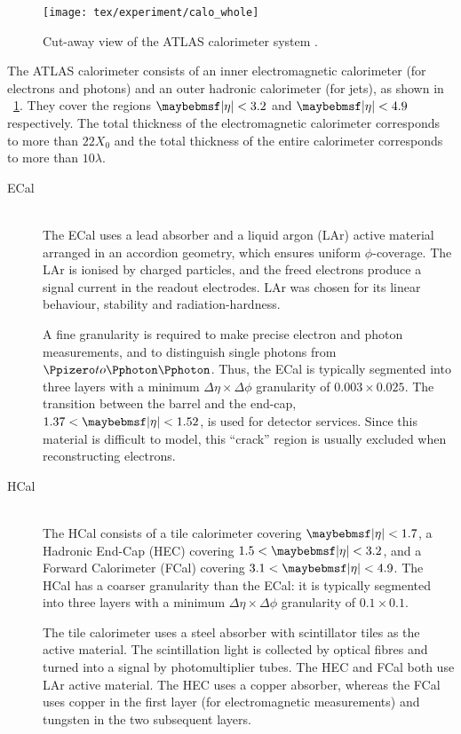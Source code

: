 \begin{figure}
	\texttt{[image: tex/experiment/calo\_whole]}
	\caption{Cut-away view of the ATLAS calorimeter system \cite{ATLAS-detector}.}
	\label{fig:calorimeters}
\end{figure}

The ATLAS calorimeter consists of an inner electromagnetic calorimeter (for electrons and 
photons) and an outer hadronic calorimeter (for jets), as shown in 
\Figure~\ref{fig:calorimeters}. They cover the regions $\mods{\eta} < 3.2$ and 
$\mods{\eta} < 4.9$ respectively. The total thickness of the electromagnetic calorimeter 
corresponds to more than $22 X_0$ and the total thickness of the entire calorimeter 
corresponds to more than $10 \lambda$.
\begin{description}
\item[\ac{ECal}] \hfill \\
	The \ac{ECal} uses a lead absorber and a liquid argon (LAr) active material arranged 
	in an accordion geometry, which ensures uniform $\phi$-coverage. The LAr is ionised 
	by charged particles, and the freed electrons produce a signal current in the readout 
	electrodes. LAr was chosen for its linear behaviour, stability and radiation-hardness.

	A fine granularity is required to make precise electron and photon measurements, and 
	to distinguish single photons from $\HepProcess{\Ppizero \HepTo \Pphoton \Pphoton}$. 
	Thus, the \ac{ECal} is typically segmented into three layers with a minimum 
	$\Delta\eta\times\Delta\phi$ granularity of $0.003 \times 0.025$. The transition 
	between the barrel and the end-cap, $1.37 < \mods{\eta} < 1.52$, is used for detector 
	services. Since this material is difficult to model, this ``crack'' region is usually 
	excluded when reconstructing electrons.

\item[\ac{HCal}] \hfill \\
	The \ac{HCal} consists of a tile calorimeter covering $\mods{\eta} < 1.7$, a Hadronic 
	End-Cap (HEC) covering $1.5 < \mods{\eta} < 3.2$, and a Forward Calorimeter (FCal) 
	covering $3.1 < \mods{\eta} < 4.9$. The \ac{HCal} has a coarser granularity than the
	\ac{ECal}: it is typically segmented into three layers with a minimum 
	$\Delta\eta\times\Delta\phi$ granularity of $0.1 \times 0.1$.

	The tile calorimeter uses a steel absorber with scintillator tiles as the active 
	material. The scintillation light is collected by optical fibres and turned into a 
	signal by photomultiplier tubes. The HEC and FCal both use LAr active material.
	The HEC uses a copper absorber, whereas the FCal uses copper in the first layer (for 
	electromagnetic measurements) and tungsten in the two subsequent layers.
\end{description}



